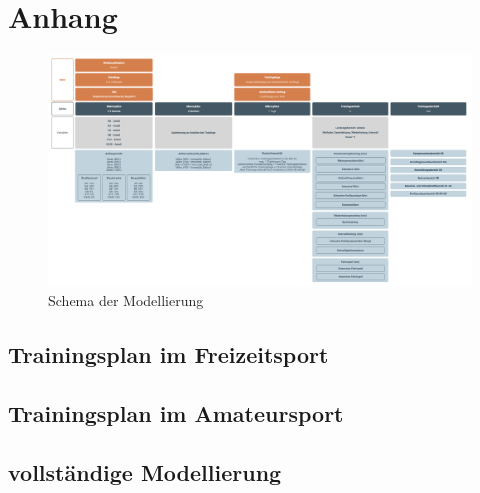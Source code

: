 \appendix
\chapter{Anhang}
\label{anhang}
\begin{figure}[h]
    \includegraphics[height=\textwidth]{gfx/modellierung.png}
    \caption{Schema der Modellierung}
    \label{anhang:modellierung}
\end{figure}

\section{Trainingsplan im Freizeitsport}
\label{anhang:freizeitsport}

\section{Trainingsplan im Amateursport}
\label{anhang:amateursport}

\section{vollständige Modellierung}
\label{anhang:code:modell}

